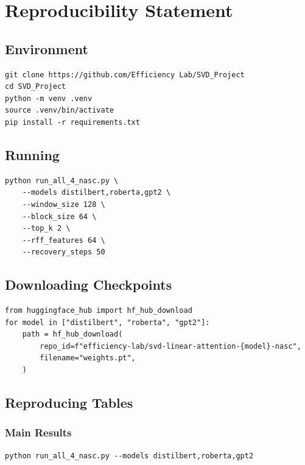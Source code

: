 
\section{Reproducibility Statement}

\subsection{Environment}

\begin{lstlisting}
git clone https://github.com/Efficiency Lab/SVD_Project
cd SVD_Project
python -m venv .venv
source .venv/bin/activate
pip install -r requirements.txt
\end{lstlisting}

\subsection{Running}

\begin{lstlisting}
python run_all_4_nasc.py \
    --models distilbert,roberta,gpt2 \
    --window_size 128 \
    --block_size 64 \
    --top_k 2 \
    --rff_features 64 \
    --recovery_steps 50
\end{lstlisting}

\subsection{Downloading Checkpoints}

\begin{lstlisting}
from huggingface_hub import hf_hub_download
for model in ["distilbert", "roberta", "gpt2"]:
    path = hf_hub_download(
        repo_id=f"efficiency-lab/svd-linear-attention-{model}-nasc",
        filename="weights.pt",
    )
\end{lstlisting}

\subsection{Reproducing Tables}

\subsubsection{Main Results}

\begin{lstlisting}
python run_all_4_nasc.py --models distilbert,roberta,gpt2
\end{lstlisting}

